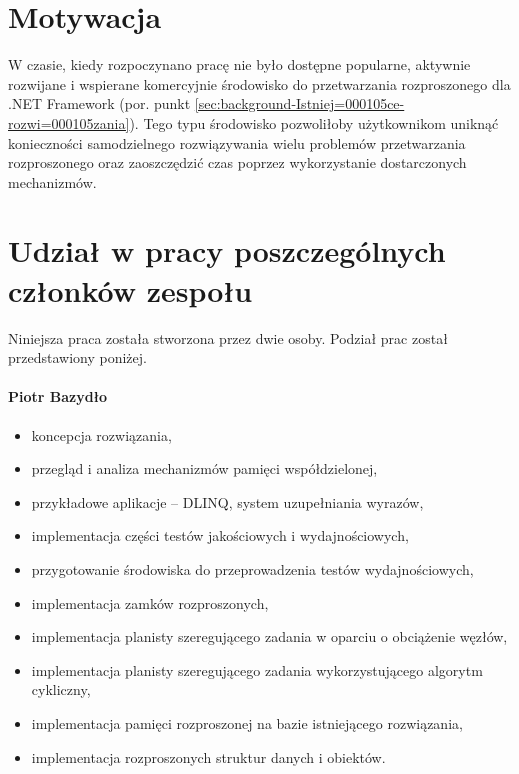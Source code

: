 \section{Motywacja}

W czasie, kiedy rozpoczynano pracę nie było dostępne popularne, aktywnie
rozwijane i wspierane komercyjnie środowisko do przetwarzania rozproszonego
dla .NET Framework (por. punkt \ref{sec:background-Istniej=000105ce-rozwi=000105zania}).
Tego typu środowisko pozwoliłoby użytkownikom uniknąć konieczności
samodzielnego rozwiązywania wielu problemów przetwarzania rozproszonego
oraz zaoszczędzić czas poprzez wykorzystanie dostarczonych mechanizmów.


\section{Udział w pracy poszczególnych członków zespołu}

Niniejsza praca została stworzona przez dwie osoby. Podział prac został
przedstawiony poniżej.


\paragraph{Piotr Bazydło}
\begin{itemize}
\item koncepcja rozwiązania,
\item przegląd i analiza mechanizmów pamięci współdzielonej,
\item przykładowe aplikacje -- DLINQ, system uzupełniania wyrazów,
\item implementacja części testów jakościowych i wydajnościowych,
\item przygotowanie środowiska do przeprowadzenia testów wydajnościowych,
\item implementacja zamków rozproszonych,
\item implementacja planisty szeregującego zadania w oparciu o obciążenie
węzłów,
\item implementacja planisty szeregującego zadania wykorzystującego algorytm
cykliczny,
\item implementacja pamięci rozproszonej na bazie istniejącego rozwiązania,
\item implementacja rozproszonych struktur danych i obiektów.
\end{itemize}

